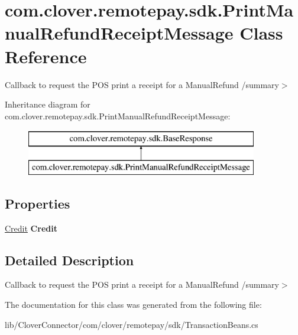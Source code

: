 \hypertarget{classcom_1_1clover_1_1remotepay_1_1sdk_1_1_print_manual_refund_receipt_message}{}\section{com.\+clover.\+remotepay.\+sdk.\+Print\+Manual\+Refund\+Receipt\+Message Class Reference}
\label{classcom_1_1clover_1_1remotepay_1_1sdk_1_1_print_manual_refund_receipt_message}


Callback to request the P\+OS print a receipt for a Manual\+Refund /summary$>$  


Inheritance diagram for com.\+clover.\+remotepay.\+sdk.\+Print\+Manual\+Refund\+Receipt\+Message\+:\begin{figure}[H]
\begin{center}
\leavevmode
\includegraphics[height=2.000000cm]{classcom_1_1clover_1_1remotepay_1_1sdk_1_1_print_manual_refund_receipt_message}
\end{center}
\end{figure}
\subsection*{Properties}
\begin{DoxyCompactItemize}
\item 
\mbox{\label{classcom_1_1clover_1_1remotepay_1_1sdk_1_1_print_manual_refund_receipt_message_a93514623c2763a437652ce93fc59f07f}} 
\hyperlink{classcom_1_1clover_1_1sdk_1_1v3_1_1payments_1_1_credit}{Credit} {\bfseries Credit}
\end{DoxyCompactItemize}


\subsection{Detailed Description}
Callback to request the P\+OS print a receipt for a Manual\+Refund /summary$>$ 

The documentation for this class was generated from the following file\+:\begin{DoxyCompactItemize}
\item 
lib/\+Clover\+Connector/com/clover/remotepay/sdk/Transaction\+Beans.\+cs\end{DoxyCompactItemize}
